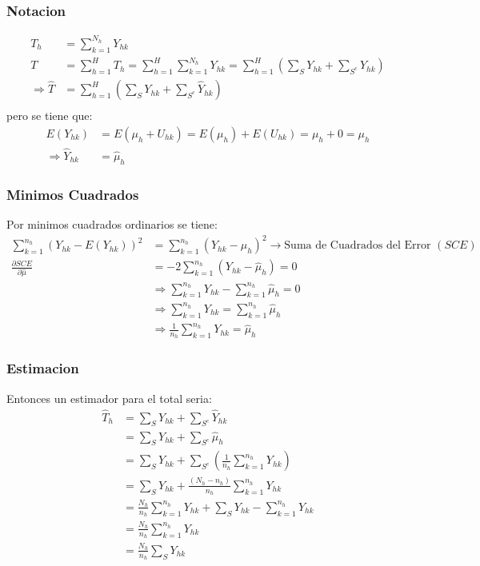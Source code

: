 ﻿\documentclass{beamer}
\begin{document}
\begin{frame}[allowframebreaks*]
\frametitle{Notacion}
{\footnotesize
\begin{align*}
T_h&=\sum\limits_{k=1}^{N_h}Y_{hk}\\
T&=\sum\limits_{h=1}^HT_h=\sum\limits_{h=1}^H\sum\limits_{k=1}^{N_h}Y_{hk}=\sum\limits_{h=1}^H\left(\sum_SY_{hk}+\sum_{S^c}Y_{hk}\right)\\
\Rightarrow \hat T&=\sum\limits_{h=1}^H\left(\sum_SY_{hk}+\sum_{S^c}\hat Y_{hk}\right)\\
\end{align*}
pero se tiene que:
\begin{align*}
E(Y_{hk})&=E(\mu_h+U_{hk})=E(\mu_h)+E(U_{hk})=\mu_h+0=\mu_h\\
\Rightarrow \hat Y_{hk}&=\hat\mu_h
\end{align*}}
\end{frame}

\begin{frame}[allowframebreaks*]
\frametitle{Minimos Cuadrados}
{\footnotesize
Por minimos cuadrados ordinarios se tiene:
\begin{align*}
\sum\limits_{k=1}^{n_h}\left(Y_{hk}-E (Y_{hk})\right)^2&=\sum\limits_{k=1}^{n_h}\left(Y_{hk}-\mu_{h}\right)^2\rightarrow \text{Suma de Cuadrados del Error } (SCE)\\
\frac{\partial SCE}{\partial\hat\mu}&=-2\sum\limits_{k=1}^{n_h}\left(Y_{hk}-\hat \mu_{h}\right)=0\\
&\Rightarrow\sum\limits_{k=1}^{n_h} Y_{hk}-\sum\limits_{k=1}^{n_h}\hat\mu_h=0\\
&\Rightarrow\sum\limits_{k=1}^{n_h}Y_{hk}=\sum\limits_{k=1}^{n_h}\hat\mu_h\\
&\Rightarrow\frac{1}{n_h}\sum\limits_{k=1}^{n_h}Y_{hk}=\hat\mu_h
\end{align*}}
\end{frame}

\begin{frame}[allowframbreaks*]
\frametitle{Estimacion}
{\footnotesize
Entonces un estimador para el total seria:
\begin{align*}
\hat T_h&=\sum_SY_{hk}+\sum_{S^c}\hat Y_{hk}\\
&=\sum_S Y_{hk}+\sum_{S^c}\hat\mu_h\\
&=\sum_S Y_{hk}+\sum_{S^c}\left(\frac{1}{n_h}\sum\limits_{k=1}^{n_h}Y_{hk}\right)\\
&=\sum_S Y_{hk}+\frac{\left(N_h-n_h\right)}{n_h}\sum\limits_{k=1}^{n_h}Y_{hk}\\
&=\frac{N_h}{n_h}\sum\limits_{k=1}^{n_h}Y_{hk}+\sum_SY_{hk}-\sum\limits_{k=1}^{n_h}Y_{hk}\\
&=\frac{N_h}{n_h}\sum\limits_{k=1}^{n_h}Y_{hk}\\
&=\frac{N_h}{n_h}\sum_S Y_{hk}
\end{align*}}
\end{frame}
\end{document}
